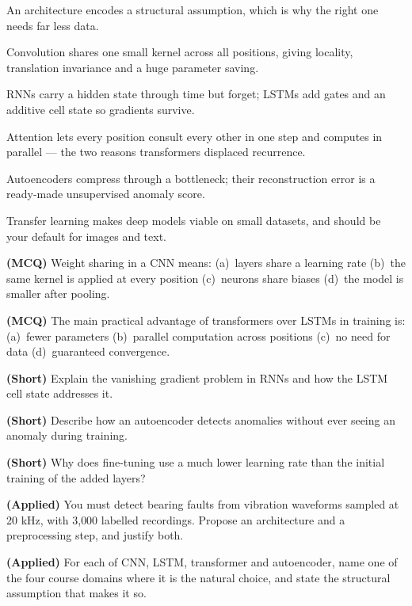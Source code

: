 \begin{chaptersummary}
\begin{tight}
  \item An architecture encodes a structural assumption, which is why the right one
        needs far less data.
  \item Convolution shares one small kernel across all positions, giving locality,
        translation invariance and a huge parameter saving.
  \item RNNs carry a hidden state through time but forget; LSTMs add gates and an
        additive cell state so gradients survive.
  \item Attention lets every position consult every other in one step and computes
        in parallel --- the two reasons transformers displaced recurrence.
  \item Autoencoders compress through a bottleneck; their reconstruction error is a
        ready-made unsupervised anomaly score.
  \item Transfer learning makes deep models viable on small datasets, and should be
        your default for images and text.
\end{tight}
\end{chaptersummary}

\begin{reviewq}
  \item \textbf{(MCQ)} Weight sharing in a CNN means: (a)~layers share a learning
        rate (b)~the same kernel is applied at every position (c)~neurons share
        biases (d)~the model is smaller after pooling.
  \item \textbf{(MCQ)} The main practical advantage of transformers over LSTMs in
        training is: (a)~fewer parameters (b)~parallel computation across positions
        (c)~no need for data (d)~guaranteed convergence.
  \item \textbf{(Short)} Explain the vanishing gradient problem in RNNs and how the
        LSTM cell state addresses it.
  \item \textbf{(Short)} Describe how an autoencoder detects anomalies without ever
        seeing an anomaly during training.
  \item \textbf{(Short)} Why does fine-tuning use a much lower learning rate than
        the initial training of the added layers?
  \item \textbf{(Applied)} You must detect bearing faults from vibration waveforms
        sampled at 20 kHz, with 3{,}000 labelled recordings. Propose an architecture
        and a preprocessing step, and justify both.
  \item \textbf{(Applied)} For each of CNN, LSTM, transformer and autoencoder, name
        one of the four course domains where it is the natural choice, and state the
        structural assumption that makes it so.
\end{reviewq}

